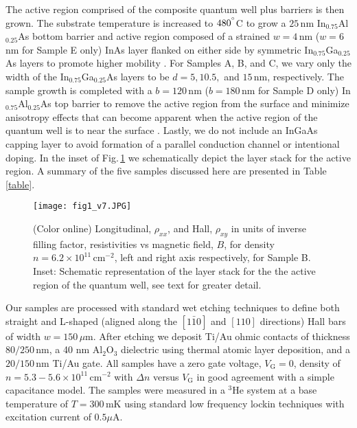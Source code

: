\documentclass[
floatfix,
aps,
prl,
twocolumn,
superscriptaddress,
amssymb,
 groupaddress,
]{revtex4}
\begin{document}
The active region comprised of the composite quantum well plus barriers is then grown. The substrate temperature is increased to $480^{\degree}$C to grow a $25\,$nm In$_{0.75}$Al$_{0.25}$As bottom barrier and active region composed of a strained $w=4\,$nm ($w=6\,$nm for Sample E only) InAs layer flanked on either side by symmetric In$_{0.75}$Ga$_{0.25}$As layers to promote higher mobility \citep{sexl:1997,wallart:2005}.
For Samples A, B, and C, we vary only the width of the In$_{0.75}$Ga$_{0.25}$As layers to be $d=5, 10.5,$ and $15\,$nm, respectively.
The sample growth is completed with a $b=120\,$nm ($b=180\,$nm for Sample D only) In$_{0.75}$Al$_{0.25}$As top barrier to remove the active region from the surface and minimize anisotropy effects that can become apparent when the active region of the quantum well is to near the surface \citep{lohr:2003}.
Lastly, we do not include an InGaAs capping layer to avoid formation of a parallel conduction channel \citep{shabani:2014} or intentional doping.
In the inset of Fig.\,\ref{fig1} we schematically depict the layer stack for the active region.  
A summary of the five samples discussed here are presented in Table\,\ref{table}.



\begin{figure}[t]
\vspace{-0.1 in}
\texttt{[image: fig1\_v7.JPG]}
\vspace{-0.25 in}
\caption{(Color online)
Longitudinal, $\rho_{xx}$, and Hall, $\rho_{xy}$ in units of inverse filling factor, resistivities vs magnetic field, $B$, for density $n=6.2\times 10^{11}\,$cm$^{-2}$, left and right axis respectively, for Sample B.
Inset: Schematic representation of the layer stack for the the active region of the quantum well, see text for greater detail.
}
\vspace{-0.1 in}
\label{fig1}
\end{figure}
Our samples are processed with standard wet etching techniques to define both straight and L-shaped (aligned along the $[1\bar{1}0]$ and $[110]$ directions) Hall bars of width $w=150\,\mu$m. 
After etching we deposit Ti/Au ohmic contacts of thickness $80/250\,$nm, a 40 nm Al$_{2}$O$_{3}$ dielectric using thermal atomic layer deposition, and a $20/150\,$nm Ti/Au gate.
All samples have a zero gate voltage, $V_{\mathrm{G}}=0$, density of  $n = 5.3-5.6 \times 10^{11}\,$cm$^{-2}$ with $\Delta n$ versus $V_{\mathrm{G}}$ in good agreement with a simple capacitance model. 
The samples were measured in a $^{3}$He system at a base temperature of $T=300\,$mK using standard low frequency lockin techniques with excitation current of $0.5 \mu$A.
\end{document}
